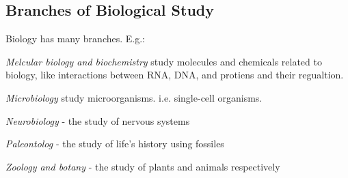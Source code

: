 \documentclass{article}
\theoremstyle{definition}
\begin{document}
\subsection{Branches of Biological Study}

Biology has many branches. E.g.:

\textit{Melcular biology and biochemistry} study molecules and chemicals related to biology, like interactions between RNA, DNA, and protiens and their regualtion.

\textit{Microbiology} study microorganisms. i.e. single-cell organisms.

\textit{Neurobiology} - the study of nervous systems

\textit{Paleontolog} - the study of life's history using fossiles

\textit{Zoology and botany} - the study of plants and animals respectively
\end{document}
